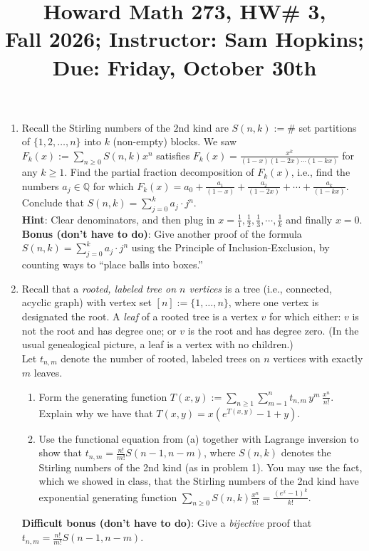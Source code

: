 \documentclass[11pt]{article}
\title{Howard Math 273, HW\# 3, \\ {\normalsize Fall 2026; Instructor: Sam Hopkins; Due: Friday, October 30th}}
\date{}
\begin{document}
\maketitle

\thispagestyle{empty}

\vspace{-1.8cm}

\begin{enumerate}

\item Recall the Stirling numbers of the $2$nd kind are $S(n,k) := \#$ set partitions of $\{1,2,\ldots,n\}$ into $k$ (non-empty) blocks. We saw $F_k(x) := \sum_{n\geq 0}S(n,k)x^n$ satisfies $F_k(x) = \frac{x^k}{(1-x)(1-2x)\cdots(1-kx)}$ for any $k \geq 1$. Find the partial fraction decomposition of $F_k(x)$, i.e., find the numbers $a_j \in \mathbb{Q}$ for which $F_k(x) = a_0 + \frac{a_1}{(1-x)} + \frac{a_2}{(1-2x)} + \cdots + \frac{a_k}{(1-kx)}$. Conclude that $S(n,k) = \sum_{j=0}^{k} a_j \cdot j^n$. \\
{\bf Hint}: Clear denominators, and then plug in $x=\frac{1}{1}, \frac{1}{2}, \frac{1}{3}, \cdots, \frac{1}{k}$ and finally $x=0$. \\
{\bf Bonus (don't have to do)}: Give another proof of the formula $S(n,k) = \sum_{j=0}^{k} a_j \cdot j^n$ using the Principle of Inclusion-Exclusion, by counting ways to ``place balls into boxes.''

\item Recall that a \emph{rooted, labeled tree on $n$ vertices} is a tree (i.e., connected, acyclic graph) with vertex set $[n] := \{1,\ldots,n\}$, where one vertex is designated the root. A \emph{leaf} of a rooted tree is a vertex $v$ for which either: $v$ is not the root and has degree one; or $v$ is the root and has degree zero. (In the usual genealogical picture, a leaf is a vertex with no children.) \\
Let $t_{n,m}$ denote the number of rooted, labeled trees on $n$ vertices with exactly $m$ leaves.
\begin{enumerate}
\item Form the generating function $T(x,y) := \sum_{n \geq 1} \sum_{m=1}^{n} t_{n,m}\, y^m \, \frac{x^n}{n!}$. Explain why we have that $T(x,y) = x(e^{T(x,y)} - 1 + y)$.
\item Use the functional equation from (a) together with Lagrange inversion to show that $t_{n,m} = \frac{n!}{m!} S(n-1,n-m)$, where $S(n,k)$ denotes the Stirling numbers of the 2nd kind (as in problem 1). You may use the fact, which we showed in class, that the Stirling numbers of the 2nd kind have exponential generating function $\sum_{n\geq 0} S(n,k) \frac{x^n}{n!} = \frac{(e^x-1)^k}{k!}$.
\end{enumerate}
{\bf Difficult bonus (don't have to do)}: Give a \emph{bijective} proof that $t_{n,m} = \frac{n!}{m!} S(n-1,n-m)$.


\end{enumerate}
\end{document}
